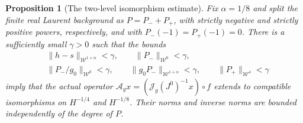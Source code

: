 \documentclass[11pt]{article}
\newtheorem{proposition}{Proposition}[section]
\begin{document}
\begin{proposition}[The two-level isomorphism estimate]
\label{prop:two-level-isomorphism}
Fix $\alpha=1/8$ and split the finite real Laurent background as
$P=P_-+P_+$, with strictly negative and strictly positive powers,
respectively, and with $P_-(-1)=P_+(-1)=0$. There is a sufficiently
small $\gamma>0$ such that the bounds
\[
\begin{split}
 &\|h-s\|_{\mathcal W^{1+\alpha}}<\gamma,\qquad
   \|P_-\|_{\mathcal W^0}<\gamma,\\
 &\|P_-/g_0\|_{\mathcal W^0}<\gamma,\qquad
   \|g_0P_-\|_{\mathcal W^{1+\alpha}}<\gamma,\qquad
   \|P_+\|_{\mathcal W^4}<\gamma
\end{split}
\]
imply that the actual operator
$\mathcal A_gx=(\mathcal J_g(J^0)^{-1}x)\circ f$ extends to
compatible isomorphisms on $H^{-1/4}$ and $H^{-1/8}$.
Their norms and inverse norms are bounded independently of the
degree of $P$.
\end{proposition}
\end{document}

